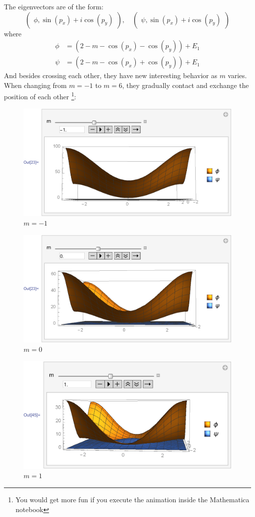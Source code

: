 \documentclass{article}
\begin{document}
    The eigenvectors are of the form:
    \begin{equation}
        \begin{pmatrix}
            \phi, \sin(p_x)+i\cos(p_y)
        \end{pmatrix},\quad \begin{pmatrix}
            \psi, \sin(p_x)+i\cos(p_y)
        \end{pmatrix}
    \end{equation}
    where
    \begin{align}
        \phi &=  (2-m-\cos(p_x)-\cos(p_y))+E_1 \\
        \psi &=  (2-m-\cos(p_x)+\cos(p_y))+E_1
    \end{align}
    And besides crossing each other, they have new interesting behavior as
    $m$ varies. When changing from $m=-1$ to $m=6$, they gradually contact
    and exchange the position of each other
    \footnote{You would get more fun if you execute the animation inside
    the Mathematica notebook}:
    \begin{figure}[H]
        \centering
        \includegraphics[width=0.6\linewidth]{pics/OpenBC-inXY/Eigen-mN1.pdf}
        \caption{$m=-1$}
    \end{figure}
    \begin{figure}[H]
        \centering
        \includegraphics[width=0.6\linewidth]{pics/OpenBC-inXY/Eigen-m0.pdf}
        \caption{$m=0$}
    \end{figure}
    \begin{figure}[H]
        \centering
        \includegraphics[width=0.6\linewidth]{pics/OpenBC-inXY/Eigen-m1.pdf}
        \caption{$m=1$}
    \end{figure}
\end{document}
